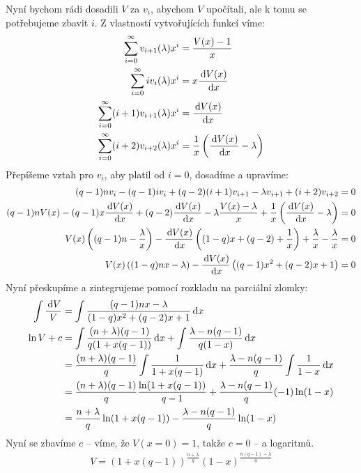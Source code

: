Nyní bychom rádi dosadili $V$ za $v_i$, abychom $V$ upočítali, ale k tomu
se potřebujeme zbavit $i$. Z vlastností vytvořujících funkcí víme:
\begin{align}
  \sum_{i=0}^\infty v_{i+1}(\lambda) x^i &= \frac{V(x) - 1}{x} \\
  \sum_{i=0}^\infty i v_i(\lambda) x^i     &= x \frac{\,\textrm{d} V(x)}{\,\textrm{d} x} \\
  \sum_{i=0}^\infty (i+1) v_{i+1}(\lambda) x^i &= \frac{\,\textrm{d} V(x)}{\,\textrm{d} x} \\
  \sum_{i=0}^\infty (i+2) v_{i+2}(\lambda) x^i &=
    \frac{1}{x}\left( \frac{\,\textrm{d} V(x)}{\,\textrm{d} x} - \lambda \right)
\end{align}
Přepíšeme vztah pro $v_i$, aby platil od $i = 0$, dosadíme a upravíme:
\begin{align}
  (q - 1)n v_i - (q - 1) i v_i + (q-2)(i+1)v_{i+1}
    - \lambda v_{i+1} +(i+2)v_{i+2} &= 0 \\
  (q - 1)n V(x) - (q - 1)x \frac{\,\textrm{d} V(x)}{\,\textrm{d} x}
    + (q-2)\frac{\,\textrm{d} V(x)}{\,\textrm{d} x} - \lambda \frac{V(x) - \lambda}{x}
    + \frac{1}{x}\left(\frac{\,\textrm{d} V(x)}{\,\textrm{d} x} - \lambda \right) &= 0 \\
  V(x) \left( (q - 1)n - \frac{\lambda}{x} \right) -
    \frac{\,\textrm{d} V(x)}{\,\textrm{d} x} \left( (1 - q)x + (q-2) + \frac{1}{x} \right)
    + \frac{\lambda}{x} - \frac{\lambda}{x} &= 0 \\
  V(x)\left( (1 - q)nx - \lambda \right) - \frac{\,\textrm{d} V(x)}{\,\textrm{d} x} \left(
    (q - 1)x^2 + (q-2)x + 1
    \right) &= 0
\end{align}
Nyní přeskupíme a zintegrujeme pomocí rozkladu na parciální zlomky:
\begin{align}
  \int \frac{\,\textrm{d} V}{V} &=
    \int \frac{(q - 1)nx - \lambda}{(1 - q)x^2 + (q-2)x + 1} \,\textrm{d} x \\
  \ln V + c &= \int \frac{(n+\lambda)(q-1)}{q(1 + x(q-1))} \,\textrm{d} x +
               \int \frac{\lambda - n(q - 1)}{q(1 - x)} \,\textrm{d} x \\
   &= \frac{(n+\lambda)(q-1)}{q} \int \frac{1}{1 + x(q-1)} \,\textrm{d} x +
               \frac{\lambda - n(q - 1)}{q} \int \frac{1}{1 - x} \,\textrm{d} x \\
   &= \frac{(n+\lambda)(q-1)}{q} \frac{\ln (1 + x(q-1))}{q-1} +
               \frac{\lambda - n(q - 1)}{q} (-1) \ln (1 - x) \\
   &= \frac{n+\lambda}{q} \ln (1 + x(q-1)) -
               \frac{\lambda - n(q - 1)}{q} \ln (1 - x)
\end{align}
Nyní se zbavíme $c$ -- víme, že $V(x = 0) = 1$, takže $c = 0$ -- a logaritmů.
\begin{align}
  V = (1 + x(q-1))^{\frac{n + \lambda}{q}} (1 - x)^{\frac{n(q-1) - \lambda}{q}}
\end{align}
